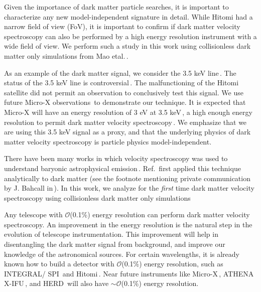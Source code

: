 \documentclass[aps,prd,10pt,twocolumn,superscriptaddress,showpacs,footinbib]{revtex4-1}
\begin{document}
Given the importance of dark matter particle searches, it is important to characterize any new model-independent signature in detail.  While Hitomi had a narrow field of view (FoV), it is important to confirm if dark matter velocity spectroscopy can also be performed by a high energy resolution instrument with a wide field of view.  We perform such a study in this work using collisionless dark matter only simulations from Mao etal.\,\cite{mao2015}.  

As an example of the dark matter signal, we consider the 3.5 keV line\,\cite{Bulbul:2014sua,Boyarsky:2014jta}.  The status of the 3.5 keV line is controversial\,\cite{Riemer-Sorensen:2014yda,Jeltema:2014qfa,Boyarsky:2014ska,Malyshev:2014xqa,Anderson:2014tza,Boyarsky:2014paa,Bulbul:2014ala,Iakubovskyi:2014yxa,Carlson:2014lla,Jeltema:2014mla,Tamura:2014mta,Iakubovskyi:2015dna,Sekiya:2015jsa,Iakubovskyi:2015kwa,Riemer-Sorensen:2015kqa,Iakubovskyi:2015wma,Jeltema:2015mee,Ruchayskiy:2015onc,Bulbul:2016yop,Aharonian:2016gzq,Hofmann:2016urz,Arguelles:2016uwb,Conlon:2016lxl,Neronov:2016wdd,Perez:2016tcq}.  The malfunctioning of the Hitomi satellite did not permit an observation to conclusively test this signal.  We use future Micro-X observations\,\cite{Figueroa-Feliciano:2015gwa} to demonstrate our technique.  It is expected that Micro-X will have an energy resolution of 3 eV at 3.5 keV\,\cite{Figueroa-Feliciano:2015gwa}, a high enough energy resolution to permit dark matter velocity spectroscopy\,\cite{speckhard2016}.  We emphasize that we are using this 3.5 keV signal as a proxy, and that the underlying physics of dark matter velocity spectroscopy is particle physics model-independent. 

There have been many works in which velocity spectroscopy was used to understand baryonic astrophysical emission\,\cite{Dame:2000sp,Diehl:2006cf,Kalberla:2008uu,Kretschmer:2013naa}.  Ref.\,\cite{speckhard2016} first applied this technique analytically to dark matter (see the footnote mentioning private communication by J. Bahcall in\,\cite{Turner:1986vr}).  In this work, we analyze for the {\it first} time dark matter velocity spectroscopy using collisionless dark matter only simulations 

Any telescope with $\mathcal{O}$(0.1\%) energy resolution can perform dark matter velocity spectroscopy.  An improvement in the energy resolution is the natural step in the evolution of telescope instrumentation.  This improvement will help in disentangling the dark matter signal from background, and improve our knowledge of the astronomical sources.  For certain wavelengths, it is already known how to build a detector with $\mathcal{O}$(0.1\%) energy resolution, such as INTEGRAL/ SPI\,\cite{2003AA} and Hitomi\,\cite{Takahashi:2012jn,2014SPIE.9144E..25T}.  Near future instruments like Micro-X\,\cite{Figueroa-Feliciano:2015gwa}, ATHENA X-IFU\,\cite{Barret:2016ett}, and HERD\,\cite{Wang:2015ema,Huang:2015fca} will also have $\sim \mathcal{O}$(0.1\%) energy resolution.
\end{document}
